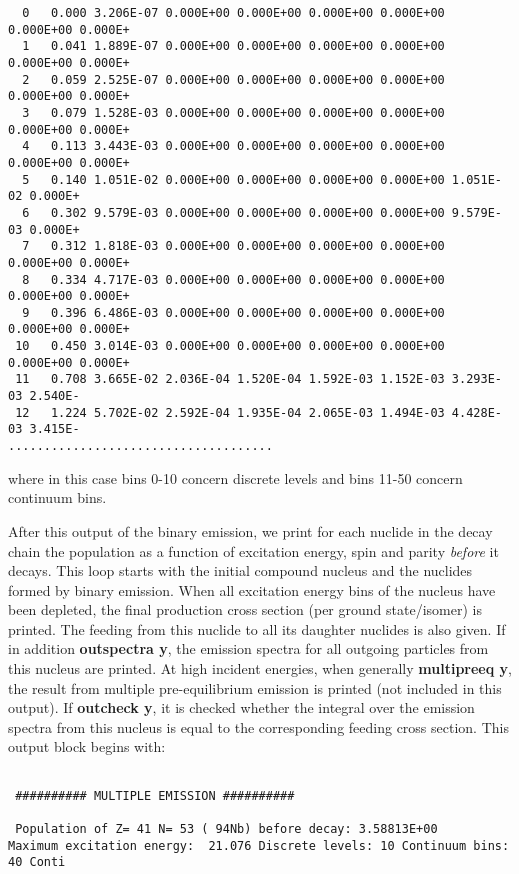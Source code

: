 \begin{samplecase}
{\begin{verbatim}
  0   0.000 3.206E-07 0.000E+00 0.000E+00 0.000E+00 0.000E+00 0.000E+00 0.000E+
  1   0.041 1.889E-07 0.000E+00 0.000E+00 0.000E+00 0.000E+00 0.000E+00 0.000E+
  2   0.059 2.525E-07 0.000E+00 0.000E+00 0.000E+00 0.000E+00 0.000E+00 0.000E+
  3   0.079 1.528E-03 0.000E+00 0.000E+00 0.000E+00 0.000E+00 0.000E+00 0.000E+
  4   0.113 3.443E-03 0.000E+00 0.000E+00 0.000E+00 0.000E+00 0.000E+00 0.000E+
  5   0.140 1.051E-02 0.000E+00 0.000E+00 0.000E+00 0.000E+00 1.051E-02 0.000E+
  6   0.302 9.579E-03 0.000E+00 0.000E+00 0.000E+00 0.000E+00 9.579E-03 0.000E+
  7   0.312 1.818E-03 0.000E+00 0.000E+00 0.000E+00 0.000E+00 0.000E+00 0.000E+
  8   0.334 4.717E-03 0.000E+00 0.000E+00 0.000E+00 0.000E+00 0.000E+00 0.000E+
  9   0.396 6.486E-03 0.000E+00 0.000E+00 0.000E+00 0.000E+00 0.000E+00 0.000E+
 10   0.450 3.014E-03 0.000E+00 0.000E+00 0.000E+00 0.000E+00 0.000E+00 0.000E+
 11   0.708 3.665E-02 2.036E-04 1.520E-04 1.592E-03 1.152E-03 3.293E-03 2.540E-
 12   1.224 5.702E-02 2.592E-04 1.935E-04 2.065E-03 1.494E-03 4.428E-03 3.415E-
.....................................
\end{verbatim} } \renewcommand{\baselinestretch}{1.07}\small\normalsize
\noindent
where in this case bins 0-10 concern discrete levels and bins 11-50 concern 
continuum bins.

After this output of the binary emission, we print
for each nuclide in the decay chain the population as a function of 
excitation energy, spin and parity {\em before} it decays. This loop starts 
with the initial compound nucleus and the nuclides formed by binary emission. 
When all excitation energy bins of the nucleus have been depleted, the final
production cross section (per ground state/isomer) is printed. The feeding from 
this nuclide to all its daughter nuclides is also given. If in addition 
{\bf outspectra y}, the emission spectra for all outgoing particles from this 
nucleus are printed. At high incident energies, when generally 
{\bf multipreeq y}, the result from multiple pre-equilibrium emission is 
printed (not included in this output). If {\bf outcheck y}, it is checked 
whether the integral over the 
emission spectra from this nucleus is equal to the corresponding feeding cross 
section. This output block begins with:

{\small \begin{verbatim}

 ########## MULTIPLE EMISSION ##########

 Population of Z= 41 N= 53 ( 94Nb) before decay: 3.58813E+00
Maximum excitation energy:  21.076 Discrete levels: 10 Continuum bins: 40 Conti


\end{verbatim}}
\end{samplecase}
